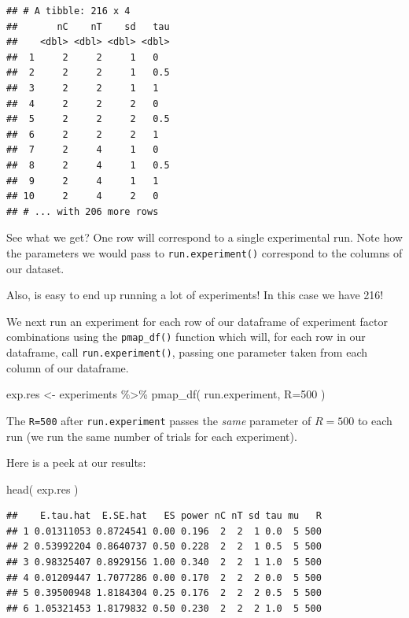 \documentclass[
]{book}
\newenvironment{Shaded}{\begin{snugshade}}{\end{snugshade}}
\newcommand{\AttributeTok}[1]{\textcolor[rgb]{0.77,0.63,0.00}{#1}}
\newcommand{\DecValTok}[1]{\textcolor[rgb]{0.00,0.00,0.81}{#1}}
\newcommand{\FunctionTok}[1]{\textcolor[rgb]{0.00,0.00,0.00}{#1}}
\newcommand{\NormalTok}[1]{#1}
\newcommand{\OtherTok}[1]{\textcolor[rgb]{0.56,0.35,0.01}{#1}}
\newcommand{\SpecialCharTok}[1]{\textcolor[rgb]{0.00,0.00,0.00}{#1}}
\begin{document}
\begin{verbatim}
## # A tibble: 216 x 4
##       nC    nT    sd   tau
##    <dbl> <dbl> <dbl> <dbl>
##  1     2     2     1   0  
##  2     2     2     1   0.5
##  3     2     2     1   1  
##  4     2     2     2   0  
##  5     2     2     2   0.5
##  6     2     2     2   1  
##  7     2     4     1   0  
##  8     2     4     1   0.5
##  9     2     4     1   1  
## 10     2     4     2   0  
## # ... with 206 more rows
\end{verbatim}

See what we get? One row will correspond to a single experimental run. Note
how the parameters we would pass to \texttt{run.experiment()} correspond to the
columns of our dataset.

Also, is easy to end up running a lot of experiments! In this case we have
216!

We next run an experiment for each row of our dataframe of experiment factor
combinations using the \texttt{pmap\_df()} function which will, for each row in our
dataframe, call \texttt{run.experiment()}, passing one parameter taken from each
column of our dataframe.

\begin{Shaded}
\begin{Highlighting}[]
\NormalTok{exp.res }\OtherTok{\textless{}{-}}\NormalTok{ experiments }\SpecialCharTok{\%\textgreater{}\%} \FunctionTok{pmap\_df}\NormalTok{( run.experiment, }\AttributeTok{R=}\DecValTok{500}\NormalTok{ )}
\end{Highlighting}
\end{Shaded}

The \texttt{R=500} after \texttt{run.experiment} passes the \emph{same} parameter of \(R=500\) to each
run (we run the same number of trials for each experiment).

Here is a peek at our results:

\begin{Shaded}
\begin{Highlighting}[]
\FunctionTok{head}\NormalTok{( exp.res )}
\end{Highlighting}
\end{Shaded}

\begin{verbatim}
##    E.tau.hat  E.SE.hat   ES power nC nT sd tau mu   R
## 1 0.01311053 0.8724541 0.00 0.196  2  2  1 0.0  5 500
## 2 0.53992204 0.8640737 0.50 0.228  2  2  1 0.5  5 500
## 3 0.98325407 0.8929156 1.00 0.340  2  2  1 1.0  5 500
## 4 0.01209447 1.7077286 0.00 0.170  2  2  2 0.0  5 500
## 5 0.39500948 1.8184304 0.25 0.176  2  2  2 0.5  5 500
## 6 1.05321453 1.8179832 0.50 0.230  2  2  2 1.0  5 500
\end{verbatim}
\end{document}
